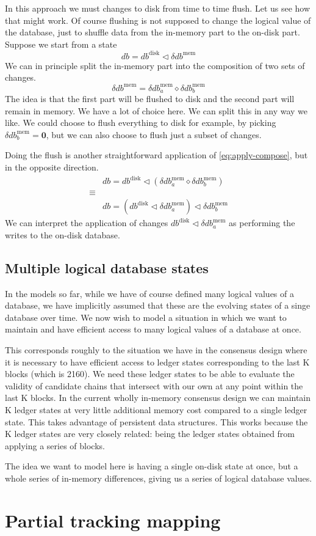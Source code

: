 \documentclass[11pt,a4paper]{article}
\begin{document}
In this approach we must changes to disk from time to time flush. Let us see
how that might work. Of course flushing is not supposed to change the logical
value of the database, just to shuffle data from the in-memory part to the
on-disk part. Suppose we start from a state
\[
\mathit{db} = \mathit{db}^{\mathrm{disk}}
      \triangleleft \delta\mathit{db}^{\mathrm{mem}}
\]
We can in principle split the in-memory part into the composition of two sets
of changes.
\[
\delta\mathit{db}^{\mathrm{mem}} = \delta\mathit{db}^{\mathrm{mem}}_a \diamond \delta\mathit{db}^{\mathrm{mem}}_b
\]
The idea is that the first part will be flushed to disk and the second part
will remain in memory. We have a lot of choice here. We can split this in any
way we like. We could choose to flush everything to disk for example, by picking
$\delta\mathit{db}^{\mathrm{mem}}_b = \mathbf{0}$, but we can also choose to
flush just a subset of changes.

Doing the flush is another straightforward application of
\cref{eq:apply-compose}, but in the opposite direction.
\begin{align*}
       & \mathit{db} = \mathit{db}^{\mathrm{disk}}
         \triangleleft \left( \delta\mathit{db}^{\mathrm{mem}}_a \diamond \delta\mathit{db}^{\mathrm{mem}}_b \right)
\\
\equiv & \\
       & \mathit{db} = \left(\mathit{db}^{\mathrm{disk}}
      \triangleleft \delta\mathit{db}^{\mathrm{mem}}_a \right) \triangleleft \delta\mathit{db}^{\mathrm{mem}}_b
\end{align*}
We can interpret the application of changes
$\mathit{db}^{\mathrm{disk}} \triangleleft \delta\mathit{db}^{\mathrm{mem}}_a$
as performing the writes to the on-disk database.

\subsection{Multiple logical database states}

In the models so far, while we have of course defined many logical values of
a database, we have implicitly assumed that these are the evolving states of
a singe database over time. We now wish to model a situation in which we want
to maintain and have efficient access to many logical values of a database at
once.

This corresponds roughly to the situation we have in the consensus design where
it is necessary to have efficient access to ledger states corresponding to the
last K blocks (which is 2160). We need these ledger states to be able to
evaluate the validity of candidate chains that intersect with our own at any
point within the last K blocks. In the current wholly in-memory consensus
design we can maintain K ledger states at very little additional memory cost
compared to a single ledger state. This takes advantage of persistent data
structures. This works because the K ledger states are very closely related:
being the ledger states obtained from applying a series of blocks.

The idea we want to model here is having a single on-disk state at once, but
a whole series of in-memory differences, giving us a series of logical database
values.


\section{Partial tracking mapping}




\end{document}
